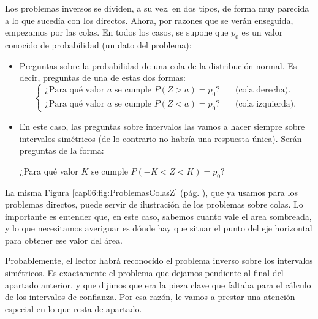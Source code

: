 Los problemas inversos se dividen, a su vez, en dos tipos, de forma muy
parecida a lo que sucedía con los directos. Ahora, por razones que se verán
enseguida, empezamos por las colas. En todos los casos, se supone que $p_0$ es
un valor conocido de probabilidad (un dato del problema):
\begin{itemize}
  \item Preguntas sobre la probabilidad de una {\sf cola} de la distribución
      normal. Es decir, preguntas de una de estas dos formas:
      \[
      \begin{cases}
      \mbox{¿Para qué valor $a$ se cumple $P(Z>a)=p_0$?}& \quad\mbox{(cola derecha)}.\\[3mm]
      \mbox{¿Para qué valor $a$ se cumple $P(Z<a)=p_0$?}& \quad\mbox{(cola izquierda)}.
      \end{cases}
      \]

  \item En este caso, las preguntas sobre intervalos las vamos a hacer
      siempre sobre intervalos simétricos (de lo contrario no habría una
      respuesta única). Serán preguntas de la forma:
      \begin{center}
      ¿Para qué valor $K$ se cumple $P(-K<Z<K)=p_0$?
      \end{center}
\end{itemize}

La misma Figura \ref{cap06:fig:ProblemasColasZ} (pág.
\pageref{cap06:fig:ProblemasColasZ}), que ya usamos para los problemas
directos, puede servir de ilustración de los problemas sobre colas. Lo
importante es entender que, en este caso, sabemos cuanto vale el area
sombreada, y lo que necesitamos averiguar es dónde hay que situar el punto del
eje horizontal para obtener ese valor del área.

Probablemente, el lector habrá reconocido el problema inverso sobre los
intervalos simétricos. Es exactamente el problema que dejamos pendiente al
final del apartado anterior, y que dijimos que era la pieza clave que faltaba
para el cálculo de los intervalos de confianza. Por esa razón, le vamos a
prestar una atención especial en lo que resta de apartado.


